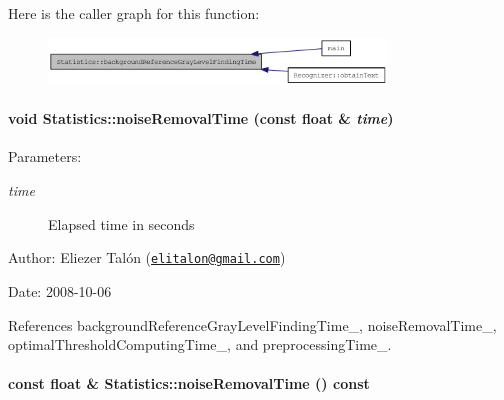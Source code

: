 Here is the caller graph for this function:\nopagebreak
\begin{figure}[H]
\begin{center}
\leavevmode
\includegraphics[width=255pt]{class_statistics_d65adc1b3bd1d560408c5f9e06fde3d4_icgraph}
\end{center}
\end{figure}
\hypertarget{class_statistics_dc21ff96ff4ddda9384eb03ac6de20de}{
\paragraph[{noiseRemovalTime}]{\setlength{\rightskip}{0pt plus 5cm}void Statistics::noiseRemovalTime (const float \& {\em time})}\hfill}
\label{class_statistics_dc21ff96ff4ddda9384eb03ac6de20de}


\begin{Desc}
\item[Parameters:]
\begin{description}
\item[{\em time}]Elapsed time in seconds\end{description}
\end{Desc}
\begin{Desc}
\item[Author:]Eliezer Talón (\href{mailto:elitalon@gmail.com}{\tt elitalon@gmail.com}) \end{Desc}
\begin{Desc}
\item[Date:]2008-10-06 \end{Desc}


References backgroundReferenceGrayLevelFindingTime\_\-, noiseRemovalTime\_\-, optimalThresholdComputingTime\_\-, and preprocessingTime\_\-.\hypertarget{class_statistics_2851ad08e1bd9604fe76c78cccc50e84}{
\paragraph[{noiseRemovalTime}]{\setlength{\rightskip}{0pt plus 5cm}const float \& Statistics::noiseRemovalTime () const}\hfill}
\label{class_statistics_2851ad08e1bd9604fe76c78cccc50e84}


